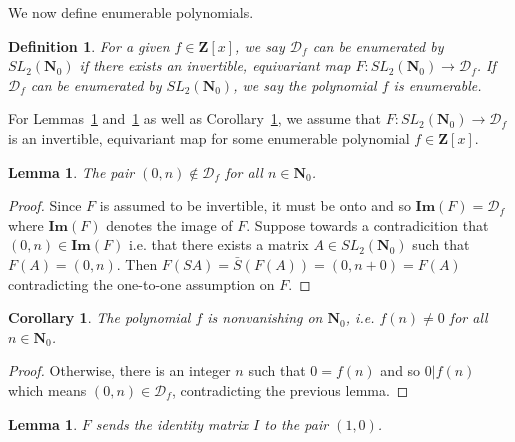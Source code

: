 \documentclass{article}
\newtheorem{definition}[theorem]{Definition}  %
\newtheorem{lemma}[theorem]{Lemma}  %
\newtheorem{corollary}[theorem]{Corollary}  %
\begin{document}
We now define enumerable polynomials.

\begin{definition}
For a given $f \in \mathbf{Z}[x]$, we say $\mathcal{D}_f$ can be enumerated by $SL_2(\mathbf{N}_0)$ if there exists an invertible, equivariant map $F: SL_2(\mathbf{N}_0) \rightarrow \mathcal{D}_f$. If $\mathcal{D}_f$ can be enumerated by $SL_2(\mathbf{N}_0)$, we say the polynomial $f$ is enumerable. 
\end{definition}


For Lemmas~\ref{lemma_(0,n)} and~\ref{lemma_F(I)=(1,0)} as well as Corollary~\ref{cor_nonvanishing}, we assume that $F: SL_2(\mathbf{N}_0) \rightarrow \mathcal{D}_f$ is an invertible, equivariant map for some enumerable polynomial $f \in \mathbf{Z}[x]$.


\begin{lemma}\label{lemma_(0,n)}
The pair $(0,n) \notin \mathcal{D}_f$
 for all  $n \in \mathbf{N}_0$.
\end{lemma}

\begin{proof}
Since $F$ is assumed to be invertible, it must be onto and so $\mathbf{Im}(F) = \mathcal{D}_f$ where $\mathbf{Im}(F)$ denotes the image of $F$. Suppose towards a contradicition that $(0, n) \in \mathbf{Im}(F)$ i.e. that there exists a matrix $A \in SL_2(\mathbf{N}_0)$ such that $F(A) = (0, n)$. Then $F(SA) = \bar{S}(F(A)) = (0, n + 0) = F(A)$ contradicting the one-to-one assumption on $F$.
\end{proof}

\begin{corollary}\label{cor_nonvanishing}
The polynomial $f$ is nonvanishing on $\mathbf{N}_0$, i.e. $f(n) \neq 0$ for all $n \in \mathbf{N}_0$.
\end{corollary}

\begin{proof}
Otherwise, there is an integer $n$ such that $0 = f(n)$ and so $0 \lvert f(n)$ which means $(0, n) \in \mathcal{D}_f$, contradicting the previous lemma.
\end{proof}

\begin{lemma}\label{lemma_F(I)=(1,0)}
$F$ sends the identity matrix $I$ to the pair $(1,0)$.
\end{lemma}
\end{document}
